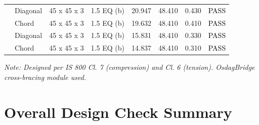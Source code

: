 \documentclass[12pt,a4paper]{report}
\numberwithin{table}{chapter}
\numberwithin{figure}{chapter}
\begin{document}
\begin{longtable}{|C{2.0cm}|L{1.8cm}|C{2.2cm}|C{3.0cm}|C{1.8cm}|C{1.8cm}|C{1.2cm}|C{1.8cm}|}
\hline
{} & Diagonal & 45 x 45 x 3 & 1.5 EQ (b) & 20.947 & 48.410 & 0.430 & \textcolor{black}{PASS} \\[6pt]
 & Chord & 45 x 45 x 3 & 1.5 EQ (b) & 19.632 & 48.410 & 0.410 & \textcolor{black}{PASS} \\[6pt]
\hline
{} & Diagonal & 45 x 45 x 3 & 1.5 EQ (b) & 15.831 & 48.410 & 0.330 & \textcolor{black}{PASS} \\[6pt]
 & Chord & 45 x 45 x 3 & 1.5 EQ (b) & 14.837 & 48.410 & 0.310 & \textcolor{black}{PASS} \\[6pt]
\hline
\end{longtable}
\noindent\textit{Note: Designed per IS 800 Cl. 7 (compression) and Cl. 6 (tension). OsdagBridge cross-bracing module used.}

\section{Overall Design Check Summary}
\label{sec:overall-summary}
\end{document}
